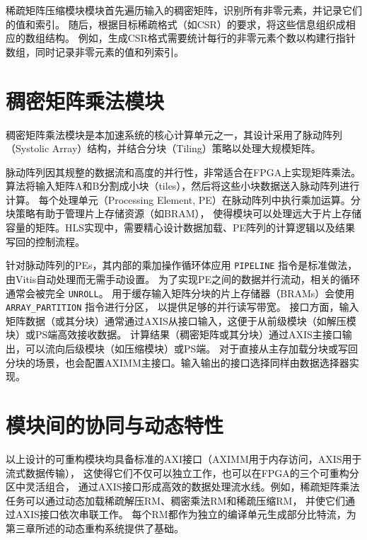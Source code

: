 稀疏矩阵压缩模块模块首先遍历输入的稠密矩阵，识别所有非零元素，并记录它们的值和索引。
随后，根据目标稀疏格式（如CSR）的要求，将这些信息组织成相应的数组结构。
例如，生成CSR格式需要统计每行的非零元素个数以构建行指针数组，同时记录非零元素的值和列索引。

\section{稠密矩阵乘法模块}

稠密矩阵乘法模块是本加速系统的核心计算单元之一，其设计采用了脉动阵列（Systolic Array）结构，并结合分块（Tiling）策略以处理大规模矩阵。

脉动阵列因其规整的数据流和高度的并行性，非常适合在FPGA上实现矩阵乘法。
算法将输入矩阵A和B分割成小块（tiles），然后将这些小块数据送入脉动阵列进行计算。
每个处理单元（Processing Element, PE）在脉动阵列中执行乘加运算。分块策略有助于管理片上存储资源（如BRAM），
使得模块可以处理远大于片上存储容量的矩阵。HLS实现中，需要精心设计数据加载、PE阵列的计算逻辑以及结果写回的控制流程。

针对脉动阵列的PEs，其内部的乘加操作循环体应用 \verb|PIPELINE| 指令是标准做法，由Vitis自动处理而无需手动设置。
为了实现PE之间的数据并行流动，相关的循环通常会被完全 \verb|UNROLL|。
用于缓存输入矩阵分块的片上存储器（BRAMs）会使用 \verb|ARRAY_PARTITION| 指令进行分区，
以提供足够的并行读写带宽。
接口方面，输入矩阵数据（或其分块）通常通过AXIS从接口输入，这便于从前级模块（如解压模块）或PS端高效接收数据。
计算结果（稠密矩阵或其分块）通过AXIS主接口输出，可以流向后级模块（如压缩模块）或PS端。
对于直接从主存加载分块或写回分块的场景，也会配置AXIMM主接口。输入输出的接口选择同样由数据选择器实现。

\section{模块间的协同与动态特性}

以上设计的可重构模块均具备标准的AXI接口（AXIMM用于内存访问，AXIS用于流式数据传输），
这使得它们不仅可以独立工作，也可以在FPGA的三个可重构分区中灵活组合，
通过AXIS接口形成高效的数据处理流水线。例如，稀疏矩阵乘法任务可以通过动态加载稀疏解压RM、稠密乘法RM和稀疏压缩RM，
并使它们通过AXIS接口依次串联工作。
每个RM都作为独立的编译单元生成部分比特流，为第三章所述的动态重构系统提供了基础。
